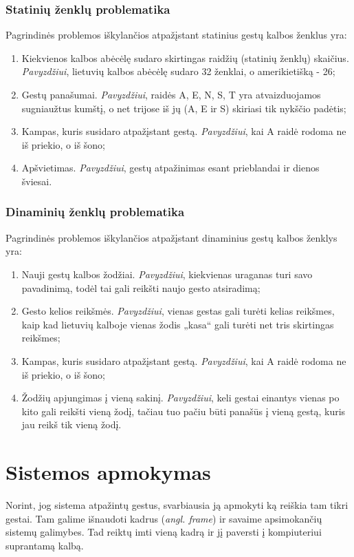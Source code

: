 \documentclass{VUMIFInfKursinis}
\begin{document}
\subsubsection{Statinių ženklų problematika}
Pagrindinės problemos iškylančios atpažįstant statinius gestų kalbos ženklus yra:
\begin{enumerate}
	\item Kiekvienos kalbos abėcėlę sudaro skirtingas raidžių (statinių ženklų) skaičius. \textit{Pavyzdžiui}, lietuvių kalbos abėcėlę sudaro 32 ženklai, o amerikietišką - 26; 
	\item Gestų panašumai. \textit{Pavyzdžiui}, raidės A, E, N, S, T yra atvaizduojamos sugniaužtus kumštį, o net trijose iš jų (A, E ir S) skiriasi tik nykščio padėtis;
	\item Kampas, kuris susidaro atpažįstant gestą. \textit{Pavyzdžiui}, kai A raidė rodoma ne iš priekio, o iš šono;
	\item Apšvietimas. \textit{Pavyzdžiui}, gestų atpažinimas esant prieblandai ir dienos šviesai.
\end{enumerate}
\subsubsection{Dinaminių ženklų problematika}
Pagrindinės problemos iškylančios atpažįstant dinaminius gestų kalbos ženklys yra:
\begin{enumerate}
	\item Nauji gestų kalbos žodžiai. \textit{Pavyzdžiui}, kiekvienas uraganas turi savo pavadinimą, todėl tai gali reikšti naujo gesto atsiradimą; 
	\item Gesto kelios reikšmės. \textit{Pavyzdžiui}, vienas gestas gali turėti kelias reikšmes, kaip kad lietuvių kalboje vienas žodis „kasa“ gali turėti net tris skirtingas reikšmes;
	\item Kampas, kuris susidaro atpažįstant gestą. \textit{Pavyzdžiui}, kai A raidė rodoma ne iš priekio, o iš šono;
	\item Žodžių apjungimas į vieną sakinį. \textit{Pavyzdžiui}, keli gestai einantys vienas po kito gali reikšti vieną žodį, tačiau tuo pačiu būti panašūs į vieną gestą, kuris jau reikš tik vieną žodį.
\end{enumerate}

\section{Sistemos apmokymas}
Norint, jog sistema atpažintų gestus, svarbiausia ją apmokyti ką reiškia tam tikri gestai. Tam galime išnaudoti kadrus (\textit{angl. frame}) ir savaime apsimokančių sistemų galimybes. Tad reiktų imti vieną kadrą ir jį paversti į kompiuteriui suprantamą kalbą. 
\end{document}
